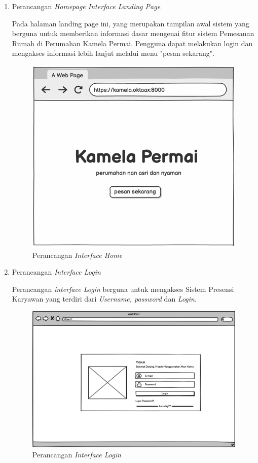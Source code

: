     \begin{enumerate}
        \item Perancangan \textit{Homepage Interface Landing Page}
        \par Pada halaman landing page ini, yang merupakan tampilan awal sistem yang berguna untuk memberikan informasi dasar mengenai fitur sistem Pemesanan Rumah di Perumahan Kamela Permai. Pengguna dapat melakukan login dan mengakses informasi lebih lanjut melalui menu "pesan sekarang".
        \begin{figure}
            \centering
            \includegraphics[width=0.75\linewidth]{Wireframe/Landing Page.png}
            \caption{Perancangan \textit{Interface Home}}
        \end{figure}
        
        \item Perancangan \textit{Interface Login}
        \par Perancangan \textit{interface Login} berguna untuk mengakses Sistem Presensi Karyawan yang terdiri dari \textit{Username, password} dan \textit{Login}.
        \begin{figure}
            \centering
            \includegraphics[width=0.75\linewidth]{Wireframe/Login.png}
            \caption{Perancangan \textit{Interface Login}}
        \end{figure}
        

\end{enumerate}
